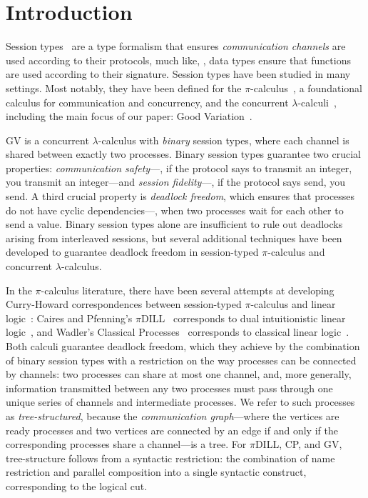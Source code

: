 \section{Introduction}
Session types~\cite{honda93,takeuchihonda94,hondavasconcelos98} are a type formalism that ensures \emph{communication channels} are used according to their protocols, much like, \eg, data types ensure that functions are used according to their signature. Session types have been studied in many settings. Most notably, they have been defined for the $\pi$-calculus~\cite{honda93,takeuchihonda94,hondavasconcelos98}, a foundational calculus for communication and concurrency, and the concurrent $\lambda$-calculi~\cite{gayvasconcelos10}, including the main focus of our paper: Good Variation~\cite[GV]{wadler15,lindleymorris15}.

GV is a concurrent $\lambda$-calculus with \emph{binary} session types, where each channel is shared between exactly two processes. Binary session types guarantee two crucial properties: \emph{communication safety}---\eg, if the protocol says to transmit an integer, you transmit an integer---and \emph{session fidelity}---\eg, if the protocol says send, you send. A third crucial property is \emph{deadlock freedom}, which ensures that processes do not have cyclic dependencies---\eg, when two processes wait for each other to send a value. Binary session types {alone} are insufficient to rule out deadlocks arising from interleaved sessions, but several additional techniques have been developed to guarantee deadlock freedom in session-typed $\pi$-calculus and concurrent $\lambda$-calculus.

In the $\pi$-calculus literature, there have been several attempts at developing Curry-Howard correspondences between session-typed $\pi$-calculus and linear logic~\cite{girard87}: Caires and Pfenning's $\pi$DILL~\cite{cairespfenning10} corresponds to dual intuitionistic linear logic~\cite{barber96}, and Wadler's Classical Processes~\cite[CP]{wadler14} corresponds to classical linear logic~\cite[CLL]{girard87}. Both calculi guarantee deadlock freedom, which they achieve by the combination of binary session types with a restriction on the way processes can be connected by channels: two processes can share at most one channel, and, more generally, information transmitted between any two processes must pass through one unique series of channels and intermediate processes. We refer to such processes as \emph{tree-structured}, because the \emph{communication graph}---where the vertices are ready processes and two vertices are connected by an edge if and only if the corresponding processes share a channel---is a tree. For $\pi$DILL, CP, and GV, tree-structure follows from a syntactic restriction: the combination of name restriction and parallel composition into a single syntactic construct, corresponding to the logical cut.

